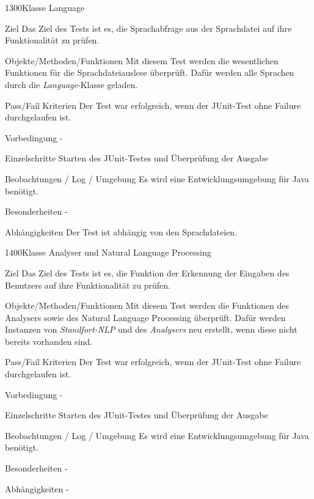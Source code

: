 \begin{testcase}{1300}{Klasse Language}
\item[Ziel] Das Ziel des Tests ist es, die Sprachabfrage aus der Sprachdatei auf
ihre Funktionalität zu prüfen.
\item[Objekte/Methoden/Funktionen] Mit diesem Test werden die wesentlichen
Funktionen für die Sprachdateiauslese überprüft.
Dafür werden alle Sprachen durch die \textit{Language}-Klasse geladen.
\item[Pass/Fail Kriterien] Der Test war erfolgreich, wenn der JUnit-Test ohne
Failure durchgelaufen ist.
\item[Vorbedingung] -
\item[Einzelschritte] Starten des JUnit-Testes und Überprüfung der Ausgabe 
\item[Beobachtungen / Log / Umgebung] Es wird eine Entwicklungsumgebung für Java
benötigt.
\item[Besonderheiten] -
\item[Abhängigkeiten] Der Test ist abhängig von den Sprachdateien.
\end{testcase}

\begin{testcase}{1400}{Klasse Analyser und Natural Language Processing}
\item[Ziel] Das Ziel des Tests ist es, die Funktion der Erkennung der Eingaben
des Benutzers auf ihre Funktionalität zu prüfen.
\item[Objekte/Methoden/Funktionen] Mit diesem Test werden die Funktionen des
Analysers sowie des Natural Language Processing überprüft. Dafür werden
Instanzen von \textit{Standfort-NLP} und des \textit{Analysers} neu erstellt,
wenn diese nicht bereits vorhanden sind.
\item[Pass/Fail Kriterien] Der Test war erfolgreich, wenn der JUnit-Test ohne
Failure durchgelaufen ist.
\item[Vorbedingung] -
\item[Einzelschritte] Starten des JUnit-Testes und Überprüfung der Ausgabe 
\item[Beobachtungen / Log / Umgebung] Es wird eine Entwicklungsumgebung für Java
benötigt.
\item[Besonderheiten] -
\item[Abhängigkeiten] -
\end{testcase}

